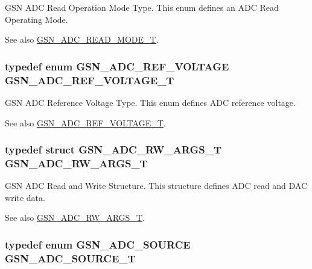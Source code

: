 GSN ADC Read Operation Mode Type. This enum defines an ADC Read Operating Mode. 

\begin{DoxySeeAlso}{See also}
\hyperlink{a00643_ga67df3ab0d6b619d585d941ad1f3f0233}{GSN\_\-ADC\_\-READ\_\-MODE\_\-T}. 
\end{DoxySeeAlso}
\hypertarget{a00643_ga560e320e7f3b88d78bb8d8766a8c7445}{
\subsubsection[{GSN\_\-ADC\_\-REF\_\-VOLTAGE\_\-T}]{\setlength{\rightskip}{0pt plus 5cm}typedef enum {\bf GSN\_\-ADC\_\-REF\_\-VOLTAGE}  {\bf GSN\_\-ADC\_\-REF\_\-VOLTAGE\_\-T}}}
\label{a00643_ga560e320e7f3b88d78bb8d8766a8c7445}


GSN ADC Reference Voltage Type. This enum defines ADC reference voltage. 

\begin{DoxySeeAlso}{See also}
\hyperlink{a00643_ga560e320e7f3b88d78bb8d8766a8c7445}{GSN\_\-ADC\_\-REF\_\-VOLTAGE\_\-T}. 
\end{DoxySeeAlso}
\hypertarget{a00643_ga7e5745ca697790cb2b29c94299ab6070}{
\subsubsection[{GSN\_\-ADC\_\-RW\_\-ARGS\_\-T}]{\setlength{\rightskip}{0pt plus 5cm}typedef struct {\bf GSN\_\-ADC\_\-RW\_\-ARGS\_\-T}  {\bf GSN\_\-ADC\_\-RW\_\-ARGS\_\-T}}}
\label{a00643_ga7e5745ca697790cb2b29c94299ab6070}


GSN ADC Read and Write Structure. This structure defines ADC read and DAC write data. 

\begin{DoxySeeAlso}{See also}
\hyperlink{a00025}{GSN\_\-ADC\_\-RW\_\-ARGS\_\-T}. 
\end{DoxySeeAlso}
\hypertarget{a00643_gab77114095147b118ac43431055973712}{
\subsubsection[{GSN\_\-ADC\_\-SOURCE\_\-T}]{\setlength{\rightskip}{0pt plus 5cm}typedef enum {\bf GSN\_\-ADC\_\-SOURCE}  {\bf GSN\_\-ADC\_\-SOURCE\_\-T}}}
\label{a00643_gab77114095147b118ac43431055973712}


